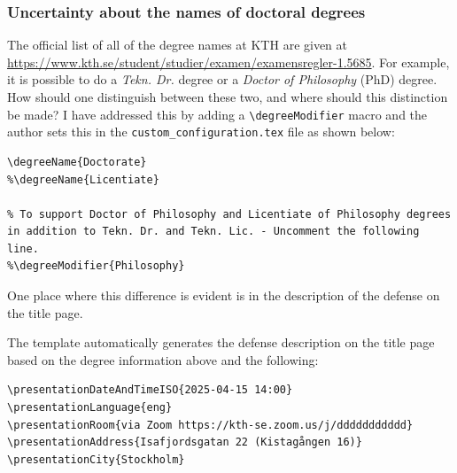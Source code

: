\documentclass[12pt, twoside]{article}
\begin{document}
\subsubsection{Uncertainty about the names of doctoral degrees}
\label{sec:cycleDoctoralDegreeQuestion}

The official list of all of the degree names at KTH are given at \url{https://www.kth.se/student/studier/examen/examensregler-1.5685}. For example, it is possible to do a \textit{Tekn. Dr.} degree or a \textit{Doctor of Philosophy} (PhD) degree. How should one distinguish between these two, and where should this distinction be made? I have addressed this by adding a \texttt{\textbackslash degreeModifier} macro and the author sets this in the \texttt{custom\_configuration.tex} file as shown below:

\begin{lstlisting}[style=latexExampleForAuthors]
\degreeName{Doctorate}
%\degreeName{Licentiate}

% To support Doctor of Philosophy and Licentiate of Philosophy degrees in addition to Tekn. Dr. and Tekn. Lic. - Uncomment the following line.
%\degreeModifier{Philosophy}
\end{lstlisting}

One place where this difference is evident is in the description of the defense on the title page.

The template automatically generates the defense description on the title page based on the degree information above and the following:
\begin{lstlisting}[style=latexExampleForAuthors]
\presentationDateAndTimeISO{2025-04-15 14:00}
\presentationLanguage{eng}
\presentationRoom{via Zoom https://kth-se.zoom.us/j/ddddddddddd}
\presentationAddress{Isafjordsgatan 22 (Kistagången 16)}
\presentationCity{Stockholm}
\end{lstlisting}

\end{document}
